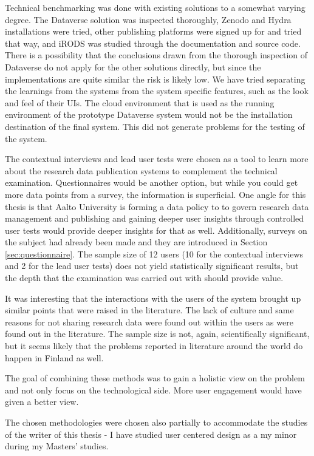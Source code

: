 Technical benchmarking was done with existing solutions to a somewhat varying degree.
The Dataverse solution was inspected thoroughly, Zenodo and Hydra installations were tried,
other publishing platforms were signed up for and tried that way, and iRODS
was studied through the documentation and source code. There is a possibility
that the conclusions drawn from the thorough inspection of Dataverse do not
apply for the other solutions directly, but since the implementations are quite
similar the risk is likely low. We have tried separating the learnings from the
systems from the system specific features, such as the look and feel of their
UIs. The cloud environment that is used as the running environment of the prototype
Dataverse system would not be the installation destination of the final system.
This did not generate problems for the testing of the system.

The contextual interviews and lead user tests were chosen as a tool to learn
more about the research data publication systems to complement the technical
examination. Questionnaires would be another option, but while you could get more data
points from a survey, the information is superficial. One angle for this thesis
is that Aalto University is forming a data policy to to govern research data
management and publishing and gaining deeper user insights through controlled
user tests would provide deeper insights for that as well. Additionally,
surveys on the subject had already been made and they are introduced in
Section \ref{sec:questionnaire}. The sample size
of 12 users (10 for the contextual interviews and 2 for the lead user tests)
does not yield statistically significant results, but the depth that the
examination was carried out with should provide value.

It was interesting that the interactions with the users of the system brought
up similar points that were raised in the literature. The lack of culture and
same reasons for not sharing research data were found out within the users as were
found out in the literature.
The sample size is not, again, scientifically significant, but
it seems likely that the problems reported in literature around the world do
happen in Finland as well.

The goal of combining these methods was to gain a holistic view on the problem
and not only focus on the technological side. More user engagement would have
given a better view.

The chosen methodologies were chosen also partially to accommodate the studies
of the writer of this thesis - I have studied user centered design as a my
minor during my Masters' studies.

